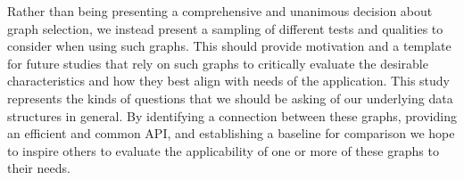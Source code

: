 Rather than being presenting a comprehensive and unanimous decision about graph selection, we instead present a sampling of different tests and qualities to consider when using such graphs.
%
This should provide motivation and a template for future studies that rely on such graphs to critically evaluate the desirable characteristics and how they best align with needs of the application.
%
This study represents the kinds of questions that we should be asking of our underlying data structures in general.
%
By identifying a connection between these graphs, providing an efficient and common API, and establishing a baseline for comparison we hope to inspire others to evaluate the applicability of one or more of these graphs to their needs.